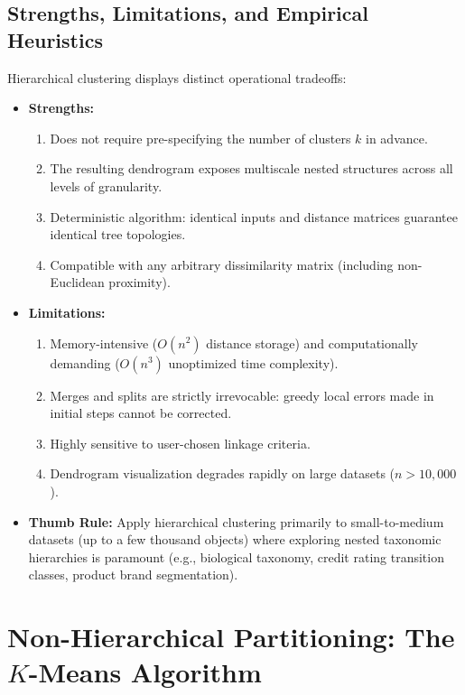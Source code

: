 \subsection{Strengths, Limitations, and Empirical Heuristics}
Hierarchical clustering displays distinct operational tradeoffs:
\begin{itemize}
    \item \textbf{Strengths:}
    \begin{enumerate}
        \item Does not require pre-specifying the number of clusters $k$ in advance.
        \item The resulting dendrogram exposes multiscale nested structures across all levels of granularity.
        \item Deterministic algorithm: identical inputs and distance matrices guarantee identical tree topologies.
        \item Compatible with any arbitrary dissimilarity matrix (including non-Euclidean proximity).
    \end{enumerate}
    \item \textbf{Limitations:}
    \begin{enumerate}
        \item Memory-intensive ($O(n^2)$ distance storage) and computationally demanding ($O(n^3)$ unoptimized time complexity).
        \item Merges and splits are strictly irrevocable: greedy local errors made in initial steps cannot be corrected.
        \item Highly sensitive to user-chosen linkage criteria.
        \item Dendrogram visualization degrades rapidly on large datasets ($n > 10{,}000$).
    \end{enumerate}
    \item \textbf{Thumb Rule:} Apply hierarchical clustering primarily to small-to-medium datasets (up to a few thousand objects) where exploring nested taxonomic hierarchies is paramount (e.g., biological taxonomy, credit rating transition classes, product brand segmentation).
\end{itemize}

\section{Non-Hierarchical Partitioning: The \texorpdfstring{$K$-Means}{K-Means} Algorithm}

